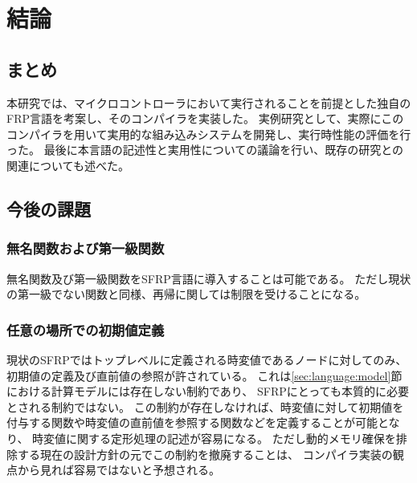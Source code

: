 \chapter{結論}
\section{まとめ}
本研究では、マイクロコントローラにおいて実行されることを前提とした独自のFRP言語を考案し、そのコンパイラを実装した。
実例研究として、実際にこのコンパイラを用いて実用的な組み込みシステムを開発し、実行時性能の評価を行った。
最後に本言語の記述性と実用性についての議論を行い、既存の研究との関連についても述べた。

\section{今後の課題}


\subsection{無名関数および第一級関数}
無名関数及び第一級関数をSFRP言語に導入することは可能である。
ただし現状の第一級でない関数と同様、再帰に関しては制限を受けることになる。

\subsection{任意の場所での初期値定義}
現状のSFRPではトップレベルに定義される時変値であるノードに対してのみ、初期値の定義及び直前値の参照が許されている。
これは\ref{sec:language:model}節における計算モデルには存在しない制約であり、
SFRPにとっても本質的に必要とされる制約ではない。
この制約が存在しなければ、時変値に対して初期値を付与する関数や時変値の直前値を参照する関数などを定義することが可能となり、
時変値に関する定形処理の記述が容易になる。
ただし動的メモリ確保を排除する現在の設計方針の元でこの制約を撤廃することは、
コンパイラ実装の観点から見れば容易ではないと予想される。


